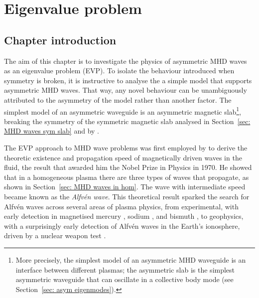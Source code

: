 
\chapter{Eigenvalue problem}
\label{chap: EVP}


\section{Chapter introduction}
\label{sec: EVP intro}

The aim of this chapter is to investigate the physics of asymmetric MHD waves as an eigenvalue problem (EVP). To isolate the behaviour introduced when symmetry is broken, it is instructive to analyse the a simple model that supports asymmetric MHD waves. That way, any novel behaviour can be unambiguously attributed to the asymmetry of the model rather than another factor. The simplest model of an asymmetric waveguide is an asymmetric magnetic slab\footnote{More precisely, the simplest model of an asymmetric MHD waveguide is an interface between different plasmas; the asymmetric slab is the simplest asymmetric waveguide that can oscillate in a collective body mode (see Section~\ref{sec: asym eigenmodes}).}, breaking the symmetry of the symmetric magnetic slab analysed in Section~\ref{sec: MHD waves sym slab} and by \cite{rob81b}.

The EVP approach to MHD wave problems was first employed by \cite{alf42} to derive the theoretic existence and propagation speed of magnetically driven waves in the fluid, the result that awarded him the Nobel Prize in Physics in 1970. He showed that in a homogeneous plasma there are three types of waves that propagate, as shown in Section~\ref{sec: MHD waves in hom}. The wave with intermediate speed became known as the \textit{Alfv\'{e}n wave}. This theoretical result sparked the search for Alfv\'{e}n waves across several areas of plasma physics, from experimental, with early detection in magnetised mercury \citep{lun49}, sodium \citep{leh54}, and bismuth \citep{hes_etal73}, to geophysics, with a surprisingly early detection of Alfv\'{e}n waves in the Earth's ionosphere, driven by a nuclear weapon test \citep{ber_etal60}.

